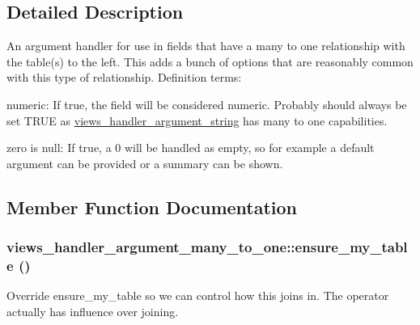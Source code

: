 \subsection{Detailed Description}
An argument handler for use in fields that have a many to one relationship with the table(s) to the left. This adds a bunch of options that are reasonably common with this type of relationship. Definition terms:
\begin{DoxyItemize}
\item numeric: If true, the field will be considered numeric. Probably should always be set TRUE as \hyperlink{classviews__handler__argument__string}{views\_\-handler\_\-argument\_\-string} has many to one capabilities.
\item zero is null: If true, a 0 will be handled as empty, so for example a default argument can be provided or a summary can be shown. 
\end{DoxyItemize}

\subsection{Member Function Documentation}
\hypertarget{classviews__handler__argument__many__to__one_af6195d516010fbd9cda241fa450a748a}{
\subsubsection[{ensure\_\-my\_\-table}]{\setlength{\rightskip}{0pt plus 5cm}views\_\-handler\_\-argument\_\-many\_\-to\_\-one::ensure\_\-my\_\-table ()}}
\label{classviews__handler__argument__many__to__one_af6195d516010fbd9cda241fa450a748a}
Override ensure\_\-my\_\-table so we can control how this joins in. The operator actually has influence over joining. 

